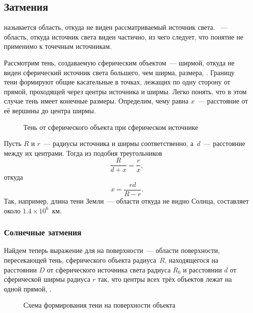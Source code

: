 \subsection{Затмения}
 называется область, откуда не виден рассматриваемый источник света. ~--- область, откуда источник света виден частично, из чего следует, что понятие  не применимо к точечным источникам.

Рассмотрим тень, создаваемую сферическим объектом~--- ширмой, откуда не виден сферический источник света большего, чем ширма, размера, . Границу тени формируют общие касательные в точках, лежащих по одну сторону от прямой, проходящей через центры источника и ширмы. Легко понять, что в этом случае тень имеет конечные размеры. Определим, чему равна  $x$~--- расстояние от её вершины до центра ширмы.

\begin{figure}[h!]
    \centering
    
    \caption{Тень от сферического объекта при сферическом источнике}
    \label{pic:shadow-length}
\end{figure}

Пусть $R$ и $r$~--- радиусы источника и ширмы соответственно, а~$d$~--- расстояние между их центрами. Тогда из подобия треугольников
\begin{equation*}
    \frac{R}{d + x} = \frac{r}{x},
\end{equation*}
откуда
\begin{equation}
    x = \frac{r d}{R - r}.
    \label{eq:eclipses-shadow-length}
\end{equation}
Так, например, длина тени Земли~--- области откуда не видно Солнца, составляет около $1.4 \times 10^{6}$~км.

\subsubsection*{Солнечные затмения}

Найдем теперь выражение для  на поверхности~--- области поверхности, пересекающей тень, сферического объекта радиуса~$R$, находящегося на расстоянии  $D$ от сферического источника света радиуса $R_0$ и расстоянии $d$ от сферической ширмы радиуса $r$ так, что центры всех трёх объектов лежат на одной прямой, .

\begin{figure}[h!]
    \centering
    
    \caption{Схема формирования тени на поверхности объекта}
    \label{pic:shadow-size-on-surface}    
\end{figure}

